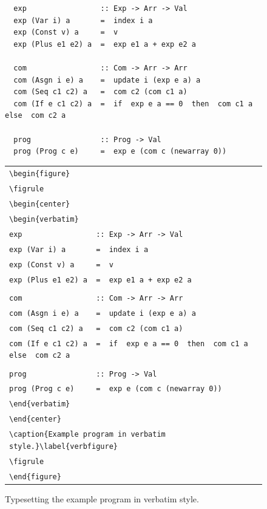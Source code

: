 \documentclass{article}
\begin{document}
\begin{figure}
\figrule
\begin{verbatim}
  exp                 :: Exp -> Arr -> Val
  exp (Var i) a       =  index i a
  exp (Const v) a     =  v
  exp (Plus e1 e2) a  =  exp e1 a + exp e2 a

  com                 :: Com -> Arr -> Arr
  com (Asgn i e) a    =  update i (exp e a) a
  com (Seq c1 c2) a   =  com c2 (com c1 a)
  com (If e c1 c2) a  =  if  exp e a == 0  then  com c1 a  else  com c2 a

  prog                :: Prog -> Val
  prog (Prog c e)     =  exp e (com c (newarray 0))
\end{verbatim}
\caption{Example program in verbatim style.}\label{verbfigure}
\figrule
\begin{tabular}{l}
\verb|\begin{figure}| \\
\verb|\figrule| \\
\verb|\begin{center}| \\
\verb|\begin{verbatim}| \\
\verb|exp                 :: Exp -> Arr -> Val| \\
\verb|exp (Var i) a       =  index i a| \\
\verb|exp (Const v) a     =  v| \\
\verb|exp (Plus e1 e2) a  =  exp e1 a + exp e2 a| \\
\\
\verb|com                 :: Com -> Arr -> Arr| \\
\verb|com (Asgn i e) a    =  update i (exp e a) a| \\
\verb|com (Seq c1 c2) a   =  com c2 (com c1 a)| \\
\verb|com (If e c1 c2) a  =  if  exp e a == 0  then  com c1 a  else  com c2 a| \\
\\
\verb|prog                :: Prog -> Val| \\
\verb|prog (Prog c e)     =  exp e (com c (newarray 0))| \\
\verb|\end{verbatim}| \\
\verb|\end{center}| \\
\verb|\caption{Example program in verbatim style.}\label{verbfigure}| \\
\verb|\figrule| \\
\verb|\end{figure}|
\end{tabular}
\caption{Typesetting the example program in verbatim style.}\label{verbtypeset}
\figrule
\end{figure}
\end{document}
